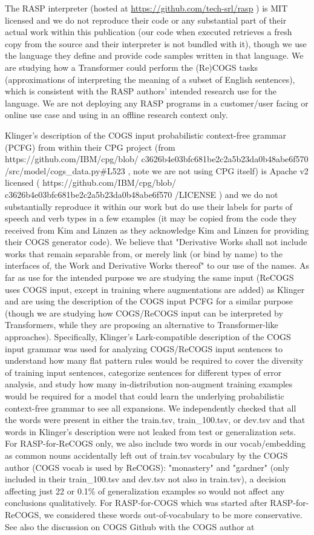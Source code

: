 \documentclass[11pt]{article}
\begin{document}
The RASP \citep{Weiss2021} interpreter (hosted at \href{https://github.com/tech-srl/rasp}{https://github.com/tech-srl/rasp} ) is MIT licensed and we do not reproduce their code or any substantial part of their actual work within this publication (our code when executed retrieves a fresh copy from the source and their interpreter is not bundled with it), though we use the language they define and provide code samples written in that language. We are studying how a Transformer could perform the (Re)COGS tasks (approximations of interpreting the meaning of a subset of English sentences), which is consistent with the RASP authors' intended research use for the language. We are not deploying any RASP programs in a customer/user facing or online use case and using in an offline research context only.
 
Klinger's description of the COGS input probabilistic context-free grammar (PCFG) from within their CPG project (from https://github.com/IBM/cpg/blob/
c3626b4e03bfc681be2c2a5b23da0b48abe6f570
/src/model/cogs\_data.py\#L523 , note we are not using CPG itself) is Apache v2 licensed ( https://github.com/IBM/cpg/blob/
c3626b4e03bfc681be2c2a5b23da0b48abe6f570
/LICENSE ) and we do not substantially reproduce it within our work but do use their labels for parts of speech and verb types in a few examples (it may be copied from the code they received from Kim and Linzen as they acknowledge Kim and Linzen for providing their COGS generator code). We believe that "Derivative Works shall not include works that remain separable from, or merely link (or bind by name) to the interfaces of, the Work and Derivative Works thereof" to our use of the names. As far as use for the intended purpose we are studying the same input (ReCOGS uses COGS input, except in training where augmentations are added) as Klinger and are using the description of the COGS input PCFG for a similar purpose (though we are studying how COGS/ReCOGS input can be interpreted by Transformers, while they are proposing an alternative to Transformer-like approaches). Specifically, Klinger's Lark-compatible description of the COGS input grammar was used for analyzing COGS/ReCOGS input sentences to understand how many flat pattern rules would be required to cover the diversity of training input sentences, categorize sentences for different types of error analysis, and study how many in-distribution non-augment training examples would be required for a model that could learn the underlying probabilistic context-free grammar to see all expansions. We independently checked that all the words were present in either the train.tsv, train\_100.tsv, or dev.tsv and that words in Klinger's description were not leaked from test or generalization sets. For RASP-for-ReCOGS only, we also include two words in our vocab/embedding as common nouns accidentally left out of train.tsv vocabulary by the COGS author (COGS vocab is used by ReCOGS): "monastery" and "gardner" (only included in their train\_100.tsv and dev.tsv not also in train.tsv), a decision affecting just 22 or 0.1\% of generalization examples so would not affect any conclusions qualitatively. For RASP-for-COGS which was started after RASP-for-ReCOGS, we considered these words out-of-vocabulary to be more conservative. See also the discussion on COGS Github with the COGS author at 
\end{document}
